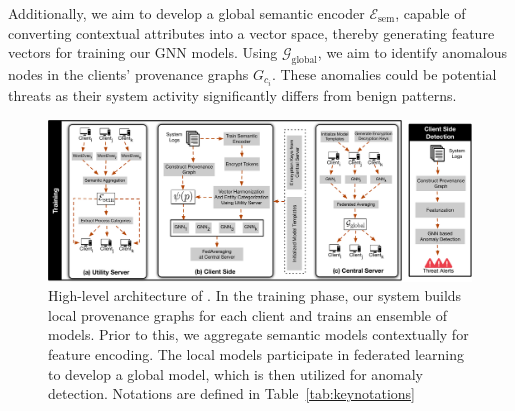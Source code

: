 Additionally, we aim to develop a global semantic encoder \( \mathcal{E}_{\text{sem}} \), capable of converting contextual attributes into a vector space, thereby generating feature vectors for training our GNN models. Using \( \mathcal{G}_{\text{global}} \), we aim to identify anomalous nodes in the clients' provenance graphs \( G_{c_i}\). These anomalies could be potential threats as their system activity significantly differs from benign patterns.

\begin{figure}[t!]
  \centering
  \includegraphics[width=1\textwidth]{fig/archv3.pdf}
  \caption{High-level architecture of \Sys. In the training phase, our system builds local provenance graphs for each client and trains an ensemble of \gnnshort models. Prior to this, we aggregate semantic models contextually for feature encoding. The local \gnnshort models participate in federated learning to develop a global \gnnshort model, which is then utilized for anomaly detection. Notations are defined in Table~\ref{tab:keynotations}}
  \vspace{-3ex}
  \label{fig:arch}
\end{figure}


  



